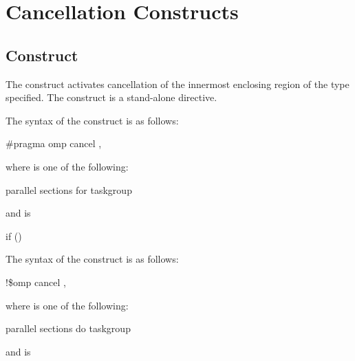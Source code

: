 \section{Cancellation Constructs}
\label{sec:Cancellation Constructs}
\subsection{ Construct}
\label{subsec:cancel Construct}
\summary
The  construct activates cancellation of the innermost enclosing region of the 
type specified. The  construct is a stand-alone directive.

\syntax
\ccppspecificstart
The syntax of the  construct is as follows:

\begin{boxedcode}
\#pragma omp cancel \plc{construct-type-clause [ [},\plc{] if-clause] new-line}
\end{boxedcode}

\begin{samepage}
where  is one of the following:

\begin{indentedcodelist}
parallel
sections
for
taskgroup
\end{indentedcodelist}
\end{samepage}

and  is
\begin{indentedcodelist}
if ()
\end{indentedcodelist}
\ccppspecificend

\fortranspecificstart
The syntax of the  construct is as follows:

\begin{boxedcode}
!\$omp cancel \plc{construct-type-clause [ [},\plc{] if-clause]}
\end{boxedcode}

\begin{samepage}
where  is one of the following:
\begin{indentedcodelist}
parallel
sections
do
taskgroup
\end{indentedcodelist}
\end{samepage}

and  is

